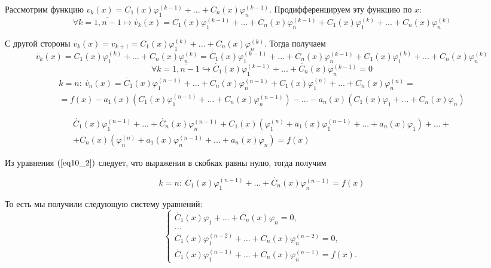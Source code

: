 Рассмотрим функцию $v_k(x) = C_1(x)\varphi_1^{(k-1)} + ... + C_n(x)\varphi_n^{(k-1)}$. Продифференцируем эту функцию по $x$:
\begin{equation}
    \forall k =\overline{1, n-1} \longmapsto \dot{v_k}(x) = \dot{C_1}(x)\varphi_1^{(k-1)} + ... + \dot{C_n}(x)\varphi_n^{(k-1)} + C_1(x)\varphi_1^{(k)} + ... + C_n(x)\varphi_n^{(k)}
\end{equation}

С другой стороны $\dot{v_k}(x) = v_{k+1} = C_1(x)\varphi_1^{(k)} + ... + C_n(x)\varphi_n^{(k)}$. Тогда получаем
\begin{equation}
    \dot{v_k}(x) = C_1(x)\varphi_1^{(k)} + ... + C_n(x)\varphi_n^{(k)} = \dot{C_1}(x)\varphi_1^{(k-1)} + ... + \dot{C_n}(x)\varphi_n^{(k-1)} + C_1(x)\varphi_1^{(k)} + ... + C_n(x)\varphi_n^{(k)}
\end{equation}
\begin{equation}
    \forall k =\overline{1, n-1} \hookrightarrow \dot{C_1}(x)\varphi_1^{(k-1)} + ... + \dot{C_n}(x)\varphi_n^{(k-1)} = 0
\end{equation}
\begin{eqnarray*}
    k = n: ~\dot{v_n}(x) = \dot{C_1}(x)\varphi_1^{(n-1)} + ... + \dot{C_n}(x)\varphi_n^{(n-1)} + C_1(x)\varphi_1^{(n)} + ... + C_n(x)\varphi_n^{(n)} = \\ = f(x) - a_1(x)\left(C_1(x)\varphi_1^{(n-1)} + ... + C_n(x)\varphi_n^{(n-1)}\right) - ... - a_n(x)\left(C_1(x)\varphi_1 + ... + C_n(x)\varphi_n\right)
\end{eqnarray*}

\begin{eqnarray*}
    \dot{C_1}(x)\varphi_1^{(n-1)} + ... + \dot{C_n}(x)\varphi_n^{(n-1)} + C_1(x)\left(\varphi_1^{(n)} + a_1(x)\varphi_1^{(n-1)} + ... + a_n(x)\varphi_1\right) + ... + \\ + C_n(x)\left(\varphi_n^{(n)} + a_1(x)\varphi_n^{(n-1)} + ... + a_n(x)\varphi_n\right) = f(x)
\end{eqnarray*}

Из уравнения $(\ref{eq10_2})$ следует, что выражения в скобках равны нулю, тогда получим

\[k = n: ~\dot{C_1}(x)\varphi_1^{(n-1)} + ... + \dot{C_n}(x)\varphi_n^{(n-1)} = f(x)\]

То есть мы получили следующую систему уравнений:
\begin{equation}\label{eq10_4}
    \begin{cases}
        \dot{C_1}(x)\varphi_1 + ... + \dot{C_n}(x)\varphi_n = 0, 
        \\
        ...
        \\
        \dot{C_1}(x)\varphi_1^{(n-2)} + ... + \dot{C_n}(x)\varphi_n^{(n-2)} = 0,
        \\
        \dot{C_1}(x)\varphi_1^{(n-1)} + ... + \dot{C_n}(x)\varphi_n^{(n-1)} = f(x).
    \end{cases}
\end{equation}

